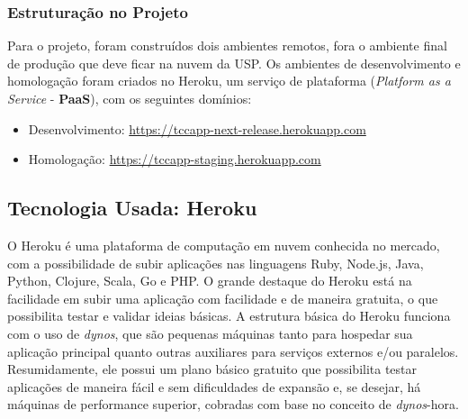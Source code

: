 \subsubsection{Estruturação no Projeto}
Para o projeto, foram construídos dois ambientes remotos, fora o ambiente final de produção que deve ficar na nuvem da USP. Os ambientes de desenvolvimento e homologação foram criados no Heroku, um serviço de plataforma (\textit{Platform as a Service} - \textbf{PaaS}), com os seguintes domínios:

\begin{itemize}
    \item Desenvolvimento: \href{https://tccapp-next-release.herokuapp.com}{https://tccapp-next-release.herokuapp.com}
    \item Homologação: \href{https://tccapp-staging.herokuapp.com}{https://tccapp-staging.herokuapp.com}
\end{itemize}

\subsection{Tecnologia Usada: Heroku}
O Heroku é uma plataforma de computação em nuvem conhecida no mercado, com a possibilidade de subir aplicações nas linguagens Ruby, Node.js, Java, Python, Clojure, Scala, Go e PHP. O grande destaque do Heroku está na facilidade em subir uma aplicação com facilidade e de maneira gratuita, o que possibilita testar e validar ideias básicas. A estrutura básica do Heroku funciona com o uso de \textit{dynos}, que são pequenas máquinas tanto para hospedar sua aplicação principal quanto outras auxiliares para serviços externos e/ou paralelos. Resumidamente, ele possui um plano básico gratuito que possibilita testar aplicações de maneira fácil e sem dificuldades de expansão e, se desejar, há máquinas de performance superior, cobradas com base no conceito de \textit{dynos}-hora.